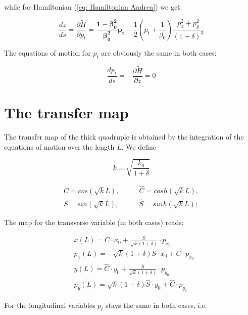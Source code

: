 \documentclass[12pt]{article}
\begin{document}
while for Hamiltonian (\ref{eq: Hamiltonian Andrea}) we get:


\begin{equation}
\label{eq: Motion PT Andrea}
\frac{dz}{ds} = \frac{\partial \tilde{H}}{\partial p_{t}} = \pmb{\frac{1-\beta_{0}^2}{\beta_{0}^2}p_{t}}- \frac{1}{2}\left(p_{t} + \frac{1}{\beta_{0}}\right)\frac{p_{x}^{2}+ p_{y}^{2}}{(1+\delta)^{3}}     
\end{equation}


The equations of motion for $p_{t}$ are obviously the same in both cases:

\begin{equation}
\label{eq: Motion PT}
\frac{dp_{t}}{ds} = -\frac{\partial \tilde{H}}{\partial z} = 0 
\end{equation}


\section{The transfer map}

The transfer map of the thick quadruple is obtained by the integration of the equations of motion over the length $L$. 
We define 

\begin{equation}
\label{eq: strengh}
k = \sqrt{\frac{k_{0}}{1+\delta}}
\end{equation}

\begin{align}
C= cos (\sqrt{k}L), \qquad &\hat{C}= cosh (\sqrt{k}L), \nonumber \\
S= sin (\sqrt{k}L), \qquad &\hat{S}= sinh (\sqrt{k}L);\nonumber
\end{align}


The map for the transverse variable (in both cases) reads:

\begin{align}
& x(L) = C\cdot x_{0} + \frac{S}{\sqrt{k}(1+\delta)}\cdot  p_{x_{0}} \\
&p_{x}(L) =  -\sqrt{k}(1+\delta)S\cdot x_{0} + C\cdot p_{x_{0}} \\
& y(L) =  \hat{C}\cdot y_{0} + \frac{\hat{S}}{\sqrt{k}(1+\delta)}\cdot  p_{y_{0}} \\
&p_{y}(L)= \sqrt{k}(1+\delta)\hat{S}\cdot y_{0} + \hat{C}\cdot p_{y_{0}} 
\end{align}

For the longitudinal variables $p_{t}$ stays the same in both cases, i.e. 
\end{document}
